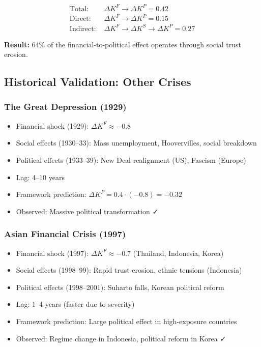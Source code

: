 \begin{align}
\text{Total: } & \Delta K^F \to \Delta K^P = 0.42 \\
\text{Direct: } & \Delta K^F \to \Delta K^P = 0.15 \\
\text{Indirect: } & \Delta K^F \to \Delta K^S \to \Delta K^P = 0.27
\end{align}

\textbf{Result:} 64\% of the financial-to-political effect operates through social trust erosion.

\subsection{Historical Validation: Other Crises}

\subsubsection{The Great Depression (1929)}

\begin{itemize}
    \item Financial shock (1929): $\Delta K^F \approx -0.8$
    \item Social effects (1930--33): Mass unemployment, Hoovervilles, social breakdown
    \item Political effects (1933--39): New Deal realignment (US), Fascism (Europe)
    \item Lag: 4--10 years
    \item Framework prediction: $\Delta K^P = 0.4 \cdot (-0.8) = -0.32$
    \item Observed: Massive political transformation ✓
\end{itemize}

\subsubsection{Asian Financial Crisis (1997)}

\begin{itemize}
    \item Financial shock (1997): $\Delta K^F \approx -0.7$ (Thailand, Indonesia, Korea)
    \item Social effects (1998--99): Rapid trust erosion, ethnic tensions (Indonesia)
    \item Political effects (1998--2001): Suharto falls, Korean political reform
    \item Lag: 1--4 years (faster due to severity)
    \item Framework prediction: Large political effect in high-exposure countries
    \item Observed: Regime change in Indonesia, political reform in Korea ✓
\end{itemize}

